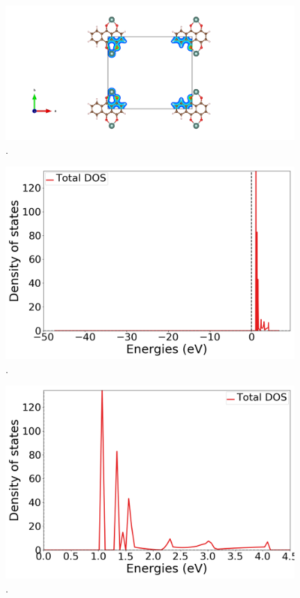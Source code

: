 \documentclass{article}
\begin{document}
  \begin{figure}[H]
      \centering
      \includegraphics[width = 11cm]{../fig/Y_staticafter_CHGCAR.png}
      \caption{. }
      \label{fig:Y_staticafter_CHGCAR}
  \end{figure}

  \begin{figure}[H]
      \centering
      \includegraphics[width = 11cm]{../fig/Y_k4_TDOS_1.png}
      \caption{. }
      \label{fig:Y_k4_TDOS_1.png}
  \end{figure}

  \begin{figure}[H]
      \centering
      \includegraphics[width = 11cm]{../fig/Y_k4_TDOS_2.png}
      \caption{. }
      \label{fig:Y_k4_TDOS_2.png}
  \end{figure}
\end{document}
